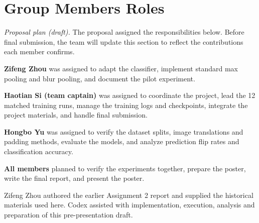 \documentclass[conference]{IEEEtran}
\begin{document}
\newpage
\section*{Group Members Roles}
\textit{Proposal plan (draft).} The proposal assigned the responsibilities below. Before final submission, the team will update this section to reflect the contributions each member confirms.

\textbf{Zifeng Zhou} was assigned to adapt the classifier, implement standard max pooling and blur pooling, and document the pilot experiment.

\textbf{Haotian Si (team captain)} was assigned to coordinate the project, lead the 12 matched training runs, manage the training logs and checkpoints, integrate the project materials, and handle final submission.

\textbf{Hongbo Yu} was assigned to verify the dataset splits, image translations and padding methods, evaluate the models, and analyze prediction flip rates and classification accuracy.

\textbf{All members} planned to verify the experiments together, prepare the poster, write the final report, and present the poster.

Zifeng Zhou authored the earlier Assignment 2 report and supplied the historical materials used here. Codex assisted with implementation, execution, analysis and preparation of this pre-presentation draft.


\end{document}
